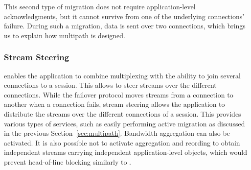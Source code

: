 
This second type of migration does not require application-level
acknowledgments, but it cannot survive from one of the
underlying connections' failure. During such a migration, data is sent over two
connections, which brings us to explain how multipath is designed.

\subsubsection{Stream Steering}

\tcpls enables the application to combine multiplexing with the ability to join
several \tcp connections to a \tcpls session. This allows to steer \tcpls
streams over the different \tcp connections. While the failover protocol moves
\tcpls streams from a connection to another when a \tcp connection fails, stream
steering allows the application to distribute the streams over the different
\tcp connections of a \tcpls session. This provides various types of services,
such as easily performing active migration as discussed in the previous
Section~\ref{sec:multipath}. Bandwidth aggregation can also be activated. It is
also possible not to activate aggregation and reording to obtain
independent streams carrying independent application-level objects, which would
prevent head-of-line blocking similarly to \quic.



